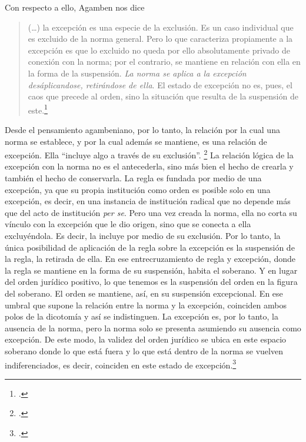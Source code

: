 Con respecto a ello, Agamben nos dice

\begin{quote}
(\ldots) la excepción es una especie de la exclusión. Es un caso individual que es excluido de la norma general. Pero lo que caracteriza propiamente a la excepción es que lo excluido no queda por ello absolutamente privado de conexión con la norma; por el contrario, se mantiene en relación con ella en la forma de la suspensión. \emph{La norma se aplica a la excepción desáplicandose, retirándose de ella}. El estado de excepción no es, pues, el caos que precede al orden, sino la situación que resulta de la suspensión de este.\footcite[30]{@7101-AGAMBEN2003}
\end{quote}

Desde el pensamiento agambeniano, por lo tanto, la relación por la cual una norma se establece, y por la cual además se mantiene, es una relación de excepción. Ella \enquote{incluye algo a través de su exclusión}. \footcite[31]{@7101-AGAMBEN2003} La relación lógica de la excepción con la norma no es el antecederla, sino más bien el hecho de crearla y también el hecho de conservarla. La regla es fundada por medio de una excepción, ya que su propia institución como orden es posible solo en una excepción, es decir, en una instancia de institución radical que no depende más que del acto de institución \emph{per se}. Pero una vez creada la norma, ella no corta su vínculo con la excepción que le dio origen, sino que se conecta a ella excluyéndola. Es decir, la incluye por medio de su exclusión. Por lo tanto, la única posibilidad de aplicación de la regla sobre la excepción es la suspensión de la regla, la retirada de ella. En ese entrecruzamiento de regla y excepción, donde la regla se mantiene en la forma de su suspensión, habita el soberano. Y en lugar del orden jurídico positivo, lo que tenemos es la suspensión del orden en la figura del soberano. El orden se mantiene, así, en su suspensión excepcional. En ese umbral que supone la relación entre la norma y la excepción, coinciden ambos polos de la dicotomía y así se indistinguen. La excepción es, por lo tanto, la ausencia de la norma, pero la norma solo se presenta asumiendo su ausencia como excepción. De este modo, la validez del orden jurídico se ubica en este espacio soberano donde lo que está fuera y lo que está dentro de la norma se vuelven indiferenciados, es decir, coinciden en este estado de excepción.\footcite[32]{@7101-AGAMBEN2003}

